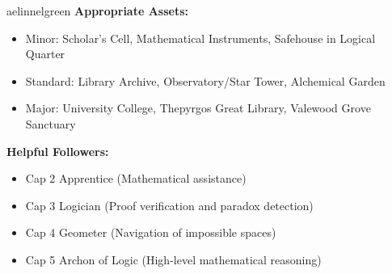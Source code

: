 \documentclass[11pt]{article}
\begin{document}
\begin{campaignsection}{aelinnelgreen}
\textbf{Appropriate Assets:}
\begin{itemize}
    \item Minor: Scholar's Cell, Mathematical Instruments, Safehouse in Logical Quarter
    \item Standard: Library Archive, Observatory/Star Tower, Alchemical Garden
    \item Major: University College, Thepyrgos Great Library, Valewood Grove Sanctuary
\end{itemize}

\textbf{Helpful Followers:}
\begin{itemize}
    \item Cap 2 Apprentice (Mathematical assistance)
    \item Cap 3 Logician (Proof verification and paradox detection)
    \item Cap 4 Geometer (Navigation of impossible spaces)
    \item Cap 5 Archon of Logic (High-level mathematical reasoning)
\end{itemize}
\end{campaignsection}

\newpage
\end{document}
